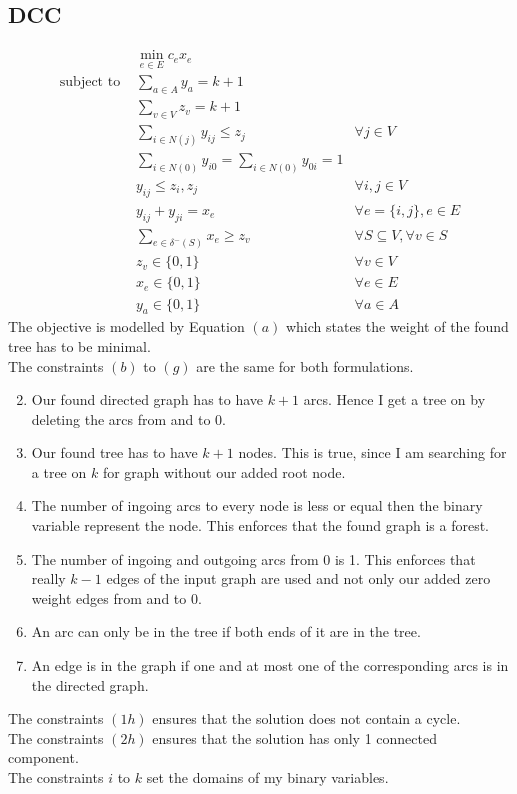 \documentclass[11pt]{article}
\begin{document}
\subsection{DCC}
\begin{subequations}
\begin{align}
 &\min_{e \in E} c_e x_e&  \\
\text{subject to }  &\sum_{a \in A} y_a = k+1& \\
 &\sum_{v \in V} z_v = k+1  \\
 &\sum_{i \in N(j)} y_{ij} \leq z_j  & \forall j \in V \\
 & \sum_{i \in N(0)}y_{i0} = \sum_{i \in N(0)} y_{0i}  = 1  \\
 & y_{ij} \leq z_i, z_j & \forall i,j \in V \\
 & y_{ij} + y_{ji} = x_e & \forall e=\{i,j\}, e \in E \\
 & \sum_{e \in \delta^{-}(S)} x_e  \geq z_v & \forall S \subseteq V, \forall v \in S \\ 
 & z_v \in \{0,1\} & \forall v \in V \\
 & x_e \in \{0,1\} & \forall e \in E \\
 & y_a \in \{0,1\} & \forall a \in A 
\end{align}
\end{subequations}
The objective is modelled by Equation $(a)$ which states the weight of the found tree has to be minimal. \\
The constraints $(b)$ to $(g)$ are the same for both formulations.
\begin{enumerate}[label=(\alph*)]
\setcounter{enumi}{1}
\item Our found directed graph has to have $k+1$ arcs. Hence I get a tree on by deleting the arcs from and to 0.
\item Our found tree has to have $k+1$ nodes. This is true, since I am searching for a tree on $k$ for graph without our added root node.
\item The number of ingoing arcs to every node is less or equal then the binary variable represent the node. This enforces that the found graph is a forest.
\item The number of ingoing and outgoing arcs from 0 is 1. This enforces that really $k-1$ edges of the input graph are used and not only our added zero weight edges from and to 0.
\item An arc can only be in the tree if both ends of it are in the tree.
\item An edge is in the graph if one and at most one of the corresponding arcs is in the directed graph.
\end{enumerate}
The constraints $(1h)$ ensures that the solution does not contain a cycle. \\
The constraints $(2h)$ ensures that the solution has only 1 connected component. \\
The constraints $i$ to $k$ set the domains of my binary variables.
\end{document}
